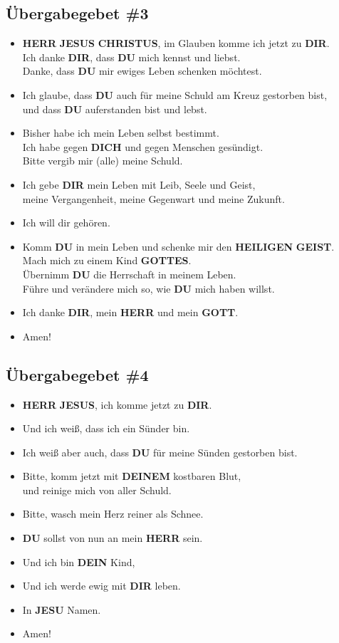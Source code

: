 \documentclass[10pt,a5paper]{article}
\newcommand{\Christus}[0]{\textbf{CHRISTUS}}
\newcommand{\Deinem}[0]{\textbf{DEINEM}}
\newcommand{\Dein}[0]{\textbf{DEIN}}
\newcommand{\Dich}[0]{\textbf{DICH}}
\newcommand{\Dir}[0]{\textbf{DIR}}
\newcommand{\Du}[0]{\textbf{DU}}
\newcommand{\Geist}[0]{\textbf{GEIST}}
\newcommand{\Gottes}[0]{\textbf{GOTTES}}
\newcommand{\Gott}[0]{\textbf{GOTT}}
\newcommand{\Heiligen}[0]{\textbf{HEILIGEN}}
\newcommand{\Herr}[0]{\textbf{HERR}}
\newcommand{\Jesus}[0]{\textbf{JESUS}}
\newcommand{\Jesu}[0]{\textbf{JESU}}
\begin{document}
	\subsection{\"Ubergabegebet \#3}
		\begin{itemize}[nosep]
			\item	{\Herr} {\Jesus} {\Christus},
					im Glauben komme ich jetzt zu {\Dir}.
			\\		Ich danke {\Dir},
					dass {\Du} mich kennst und liebst.
			\\		Danke,
					dass {\Du} mir ewiges Leben schenken m\"ochtest.
			\item	Ich glaube,
					dass {\Du} auch f\"ur meine Schuld am Kreuz gestorben bist,
			\\		und dass {\Du} auferstanden bist und lebst.
			\item	Bisher habe ich mein Leben selbst bestimmt.
			\\		Ich habe gegen {\Dich} und gegen Menschen ges\"undigt.
			\\		Bitte vergib mir (alle) meine Schuld.
			\item	Ich gebe {\Dir} mein Leben mit Leib,
					Seele und Geist,
			\\		meine Vergangenheit,
					meine Gegenwart und meine Zukunft.
			\item	Ich will dir geh\"oren.
			\item	Komm {\Du} in mein Leben und schenke mir den {\Heiligen} {\Geist}.
			\\		Mach mich zu einem Kind {\Gottes}.
			\\		\"Ubernimm {\Du} die Herrschaft in meinem Leben.
			\\		F\"uhre und ver\"andere mich so,
					wie {\Du} mich haben willst.
			\item	Ich danke {\Dir},
					mein {\Herr} und mein {\Gott}.
			\item	Amen!
		\end{itemize}
		
	\subsection{\"Ubergabegebet \#4}
		\begin{itemize}[nosep]
			\item	{\Herr} {\Jesus},
					ich komme jetzt zu {\Dir}.
			\item	Und ich wei{\ss},
					dass ich ein S\"under bin.
			\item	Ich wei{\ss} aber auch,
					dass {\Du} f\"ur meine S\"unden gestorben bist.
			\item	Bitte, komm jetzt mit {\Deinem} kostbaren Blut,
			\\		und reinige mich von aller Schuld.
			\item	Bitte, wasch mein Herz reiner als Schnee.
			\item	{\Du} sollst von nun an mein {\Herr} sein.
			\item	Und ich bin {\Dein} Kind,
			\item	Und ich werde ewig mit {\Dir} leben.
			\item	In {\Jesu} Namen.
			\item	Amen!
		\end{itemize}
	
\end{document}
